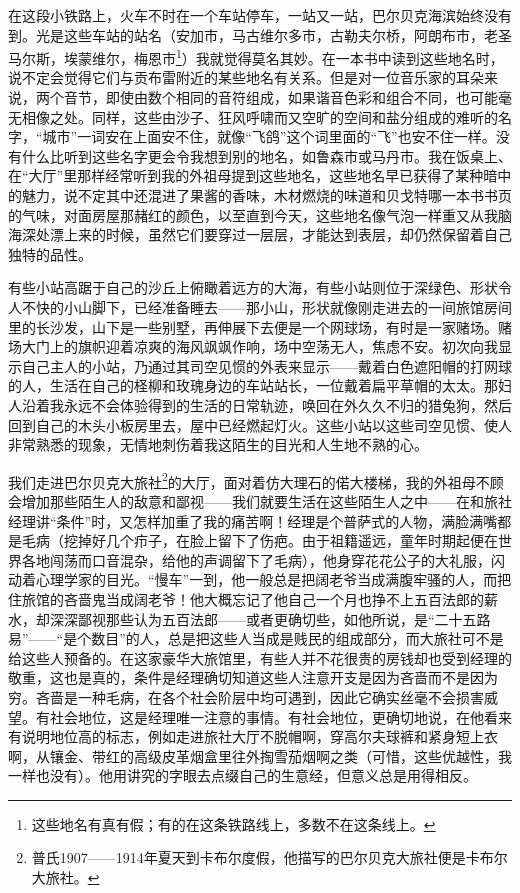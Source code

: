 \par 在这段小铁路上，火车不时在一个车站停车，一站又一站，巴尔贝克海滨始终没有到。光是这些车站的站名（安加市，马古维尔多市，古勒夫尔桥，阿朗布市，老圣马尔斯，埃蒙维尔，梅恩市\footnote{这些地名有真有假；有的在这条铁路线上，多数不在这条线上。}）我就觉得莫名其妙。在一本书中读到这些地名时，说不定会觉得它们与贡布雷附近的某些地名有关系。但是对一位音乐家的耳朵来说，两个音节，即使由数个相同的音符组成，如果谐音色彩和组合不同，也可能毫无相像之处。同样，这些由沙子、狂风呼啸而又空旷的空间和盐分组成的难听的名字，“城市”一词安在上面安不住，就像“飞鸽”这个词里面的“飞”也安不住一样。没有什么比听到这些名字更会令我想到别的地名，如鲁森市或马丹市。我在饭桌上、在“大厅”里那样经常听到我的外祖母提到这些地名，这些地名早已获得了某种暗中的魅力，说不定其中还混进了果酱的香味，木材燃烧的味道和贝戈特哪一本书书页的气味，对面房屋那赭红的颜色，以至直到今天，这些地名像气泡一样重又从我脑海深处漂上来的时候，虽然它们要穿过一层层，才能达到表层，却仍然保留着自己独特的品性。
\par 有些小站高踞于自己的沙丘上俯瞰着远方的大海，有些小站则位于深绿色、形状令人不快的小山脚下，已经准备睡去——那小山，形状就像刚走进去的一间旅馆房间里的长沙发，山下是一些别墅，再伸展下去便是一个网球场，有时是一家赌场。赌场大门上的旗帜迎着凉爽的海风飒飒作响，场中空荡无人，焦虑不安。初次向我显示自己主人的小站，乃通过其司空见惯的外表来显示——戴着白色遮阳帽的打网球的人，生活在自己的柽柳和玫瑰身边的车站站长，一位戴着扁平草帽的太太。那妇人沿着我永远不会体验得到的生活的日常轨迹，唤回在外久久不归的猎兔狗，然后回到自己的木头小板房里去，屋中已经燃起灯火。这些小站以这些司空见惯、使人非常熟悉的现象，无情地刺伤着我这陌生的目光和人生地不熟的心。
\par 我们走进巴尔贝克大旅社\footnote{普氏1907——1914年夏天到卡布尔度假，他描写的巴尔贝克大旅社便是卡布尔大旅社。}的大厅，面对着仿大理石的偌大楼梯，我的外祖母不顾会增加那些陌生人的敌意和鄙视——我们就要生活在这些陌生人之中——在和旅社经理讲“条件”时，又怎样加重了我的痛苦啊！经理是个普萨式的人物，满脸满嘴都是毛病（挖掉好几个疖子，在脸上留下了伤疤。由于祖籍遥远，童年时期起便在世界各地闯荡而口音混杂，给他的声调留下了毛病），他身穿花花公子的大礼服，闪动着心理学家的目光。“慢车”一到，他一般总是把阔老爷当成满腹牢骚的人，而把住旅馆的吝啬鬼当成阔老爷！他大概忘记了他自己一个月也挣不上五百法郎的薪水，却深深鄙视那些认为五百法郎——或者更确切些，如他所说，是“二十五路易”——“是个数目”的人，总是把这些人当成是贱民的组成部分，而大旅社可不是给这些人预备的。在这家豪华大旅馆里，有些人并不花很贵的房钱却也受到经理的敬重，这也是真的，条件是经理确切知道这些人注意开支是因为吝啬而不是因为穷。吝啬是一种毛病，在各个社会阶层中均可遇到，因此它确实丝毫不会损害威望。有社会地位，这是经理唯一注意的事情。有社会地位，更确切地说，在他看来有说明地位高的标志，例如走进旅社大厅不脱帽啊，穿高尔夫球裤和紧身短上衣啊，从镶金、带红的高级皮革烟盒里往外掏雪茄烟啊之类（可惜，这些优越性，我一样也没有）。他用讲究的字眼去点缀自己的生意经，但意义总是用得相反。
